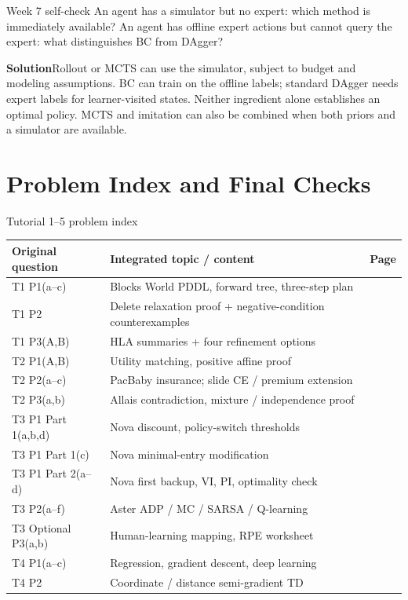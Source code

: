 \documentclass[10pt,a4paper]{article}
\newcommand{\ans}{\par\smallskip\textbf{\color{good}Solution\quad}}
\newcommand{\topic}[1]{\clearpage\section{#1}}
\begin{document}
\begin{question}{Week 7 self-check}
An agent has a simulator but no expert: which method is immediately available? An agent has offline expert actions but cannot query the expert: what distinguishes BC from DAgger?
\ans Rollout or MCTS can use the simulator, subject to budget and modeling assumptions. BC can train on the offline labels; standard DAgger needs expert labels for learner-visited states. Neither ingredient alone establishes an optimal policy. MCTS and imitation can also be combined when both priors and a simulator are available.
\end{question}

\topic{Problem Index and Final Checks}
\begin{card}{Tutorial 1--5 problem index}
\small
\par\smallskip
\begin{tabularx}{\linewidth}{@{}P{2.9cm}Y r@{}}
\toprule Original question & Integrated topic / content & Page \\\midrule
T1 P1(a--c) & Blocks World PDDL, forward tree, three-step plan & \pageref{q:t1p1} \\
T1 P2 & Delete relaxation proof + negative-condition counterexamples & \pageref{q:t1p2} \\
T1 P3(A,B) & HLA summaries + four refinement options & \pageref{q:t1p3} \\
T2 P1(A,B) & Utility matching, positive affine proof & \pageref{q:t2p1} \\
T2 P2(a--c) & PacBaby insurance; slide CE / premium extension & \pageref{q:t2p2} \\
T2 P3(a,b) & Allais contradiction, mixture / independence proof & \pageref{q:t2p3} \\
T3 P1 Part 1(a,b,d) & Nova discount, policy-switch thresholds & \pageref{q:t3p1discount} \\
T3 P1 Part 1(c) & Nova minimal-entry modification & \pageref{q:t3p1modify} \\
T3 P1 Part 2(a--d) & Nova first backup, VI, PI, optimality check & \pageref{q:t3p1dp} \\
T3 P2(a--f) & Aster ADP / MC / SARSA / Q-learning & \pageref{q:t3p2} \\
T3 Optional P3(a,b) & Human-learning mapping, RPE worksheet & \pageref{q:t3optional} \\
T4 P1(a--c) & Regression, gradient descent, deep learning & \pageref{q:t4p1} \\
T4 P2 & Coordinate / distance semi-gradient TD & \pageref{q:t4p2} \\

\end{tabularx}
\end{card}
\end{document}
